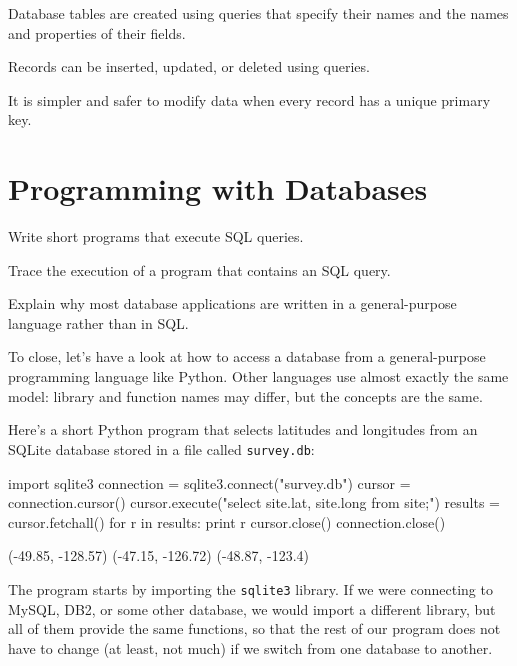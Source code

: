 \documentclass{book}
\begin{document}
\begin{keypoints}
\begin{swcitemize}
\item
  Database tables are created using queries that specify their names and
  the names and properties of their fields.
\item
  Records can be inserted, updated, or deleted using queries.
\item
  It is simpler and safer to modify data when every record has a unique
  primary key.
\end{swcitemize}
\end{keypoints}

\section{Programming with Databases}

\begin{objectives}
\begin{swcitemize}
\item
  Write short programs that execute SQL queries.
\item
  Trace the execution of a program that contains an SQL query.
\item
  Explain why most database applications are written in a
  general-purpose language rather than in SQL.
\end{swcitemize}
\end{objectives}

To close, let's have a look at how to access a database from a
general-purpose programming language like Python. Other languages use
almost exactly the same model: library and function names may differ,
but the concepts are the same.

Here's a short Python program that selects latitudes and longitudes from
an SQLite database stored in a file called \texttt{survey.db}:

\begin{VerbIn}
import sqlite3
connection = sqlite3.connect("survey.db")
cursor = connection.cursor()
cursor.execute("select site.lat, site.long from site;")
results = cursor.fetchall()
for r in results:
    print r
cursor.close()
connection.close()
\end{VerbIn}

\begin{VerbOut}
(-49.85, -128.57)
(-47.15, -126.72)
(-48.87, -123.4)
\end{VerbOut}

The program starts by importing the \texttt{sqlite3} library. If we were
connecting to MySQL, DB2, or some other database, we would import a
different library, but all of them provide the same functions, so that
the rest of our program does not have to change (at least, not much) if
we switch from one database to another.
\end{document}
